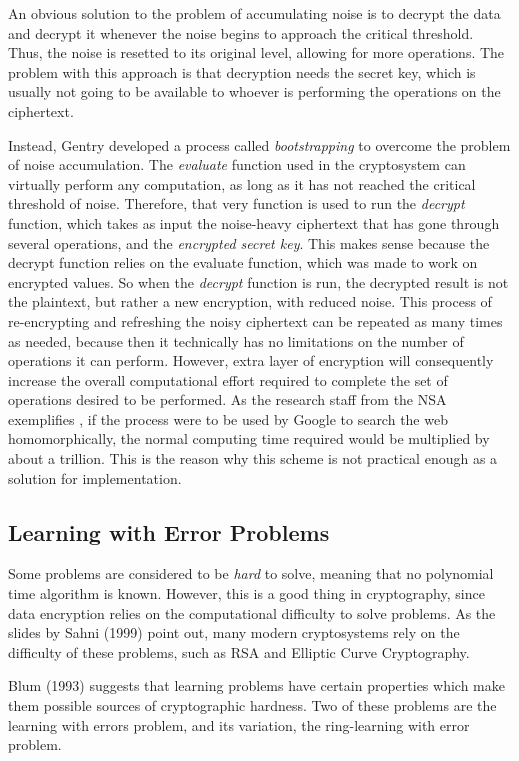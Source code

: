 An obvious solution to the problem of accumulating noise is to decrypt the data and decrypt it whenever the noise begins to approach the critical threshold. Thus, the noise is resetted to its original level, allowing for more operations. The problem with this approach is that decryption needs the secret key, which is usually not going to be available to whoever is performing the operations on the ciphertext. 

Instead, Gentry developed a process called \emph{bootstrapping} to overcome the problem of noise accumulation. The \emph{evaluate} function used in the cryptosystem can virtually perform any computation, as long as it has not reached the critical threshold of noise. Therefore, that very function is used to run the \emph{decrypt} function, which takes as input the noise-heavy ciphertext that has gone through several operations, and the \emph{encrypted secret key}. This makes sense because the decrypt function relies on the evaluate function, which was made to work on encrypted values. So when the \emph{decrypt} function is run, the decrypted result is not the plaintext, but rather a new encryption, with reduced noise. This process of re-encrypting and refreshing the noisy ciphertext can be repeated as many times as needed, because then it technically has no limitations on the number of operations it can perform. However, extra layer of encryption will consequently increase the overall computational effort required to complete the set of operations desired to be performed. As the research staff from the NSA exemplifies \cite{NSA2014}, if the process were to be used by Google to search the web homomorphically, the normal computing time required would be multiplied by about a trillion. This is the reason why this scheme is not practical enough as a solution for implementation.

\subsection{Learning with Error Problems}

Some problems are considered to be \emph{hard} to solve, meaning that no polynomial time algorithm is known. However, this is a good thing in cryptography, since data encryption relies on the computational difficulty to solve problems. As the slides by Sahni (1999) \cite{sahni1999} point out, many modern cryptosystems rely on the difficulty of these problems, such as RSA and Elliptic Curve Cryptography.

Blum (1993) \cite{Blum:1993:CPB:646758.759585} suggests that learning problems have certain properties which make them possible sources of cryptographic hardness. Two of these problems are the learning with errors problem, and its variation, the ring-learning with error problem.

